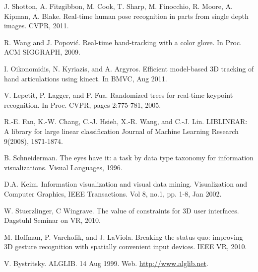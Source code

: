 \documentclass[11pt]{article}
\begin{document}

\begin{thebibliography}{9}

 J. Shotton, A. Fitzgibbon, M. Cook, T. Sharp, M. Finocchio, R. Moore, A. Kipman, A. Blake. Real-time human pose recognition in parts from single depth images. CVPR, 2011.

 R. Wang and J. Popovi\'c. Real-time hand-tracking with a color glove. In Proc. ACM SIGGRAPH, 2009.

 I. Oikonomidis, N. Kyriazis, and A. Argyros. Efficient model-based 3D tracking of hand articulations using kinect. In BMVC, Aug 2011.

 V. Lepetit, P. Lagger, and P. Fua. Randomized trees for real-time keypoint recognition. In Proc. CVPR, pages 2:775-781, 2005. 

 R.-E. Fan, K.-W. Chang, C.-J. Hsieh, X.-R. Wang, and C.-J. Lin. LIBLINEAR: A library for large linear classification Journal of Machine Learning Research 9(2008), 1871-1874.

 B. Schneiderman. The eyes have it: a task by data type taxonomy for information visualizations. Visual Languages, 1996.

 D.A. Keim. Information visualization and visual data mining. Visualization and Computer Graphics, IEEE Transactions. Vol 8, no.1, pp. 1-8, Jan 2002.

 W. Stuerzlinger, C Wingrave. The value of constraints for 3D user interfaces. Dagstuhl Seminar on VR, 2010.

 M. Hoffman, P. Varcholik, and J. LaViola. Breaking the status quo: improving 3D gesture recognition with spatially convenient input devices. IEEE VR, 2010.

 V. Bystritsky. ALGLIB. 14 Aug 1999. Web. \url{http://www.alglib.net}.

\end{thebibliography}
\end{document}
